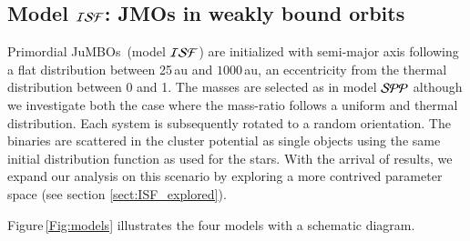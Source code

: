 \documentclass[submission,phys]{lib/SciPost}
\newcommand{\jumbos}{\mbox{JuMBOs}}
\begin{document}
\subsection{Model ${\cal ISF}$: JMOs in weakly bound orbits}

Primordial \jumbos\, (model ${\cal ISF}$) are initialized with
semi-major axis following a flat distribution between 25\,au and
$1000$\,au, an eccentricity from the thermal distribution between 0
and 1. The masses are selected as in model ${\cal SPP}$ although we investigate
both the case where the mass-ratio follows a uniform and thermal distribution.  Each system is subsequently
rotated to a random orientation.  The binaries are scattered in the
cluster potential as single objects using the same initial
distribution function as used for the stars. With the arrival of results,
we expand our analysis on this scenario by exploring a more contrived parameter
space (see section \ref{sect:ISF_explored}).


Figure\,\ref{Fig:models} illustrates the four models with a
schematic diagram.
\end{document}
